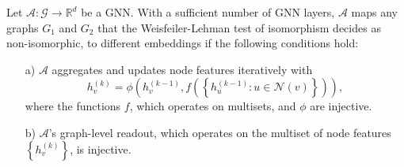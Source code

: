 \vspace{0.05in}
\begin{theorem} \label{theorem:condition}
Let $\mathcal{A}: \mathcal{G} \rightarrow \mathbb{R}^d$ be a GNN. 
With a sufficient number of GNN layers, $\mathcal{A}$ maps any graphs $G_1$ and $G_2$ that the Weisfeiler-Lehman test of isomorphism decides as non-isomorphic, to different embeddings if the following conditions hold:
%
\vspace{-0.07in}
\begin{itemize}[leftmargin=0.5cm]
 \item[a)] $\mathcal{A}$ aggregates and updates node features iteratively with \label{condition-a}
 \[h_v^{(k)} = \phi \left( h_v^{(k-1)}, f \left( \left\lbrace h_u^{(k-1)}: u\in \mathcal{N}(v)  \right\rbrace \right) \right),\] %
where the functions $f$, which operates on multisets, and $\phi$ are injective.
 \vspace{-0.1in}
\item[b)] $\mathcal{A}$'s graph-level readout, which operates on the multiset of node features $\left\lbrace h_v^{(k)} \right\rbrace $, is injective.
\end{itemize}
\end{theorem}
 \vspace{-0.05in}
 
